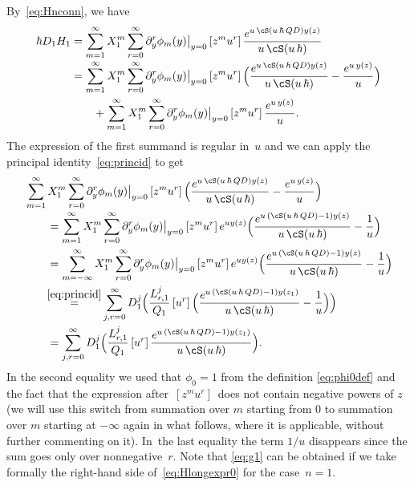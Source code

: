 By~\eqref{eq:Hnconn}, we have\vspace*{-3pt}
\begin{equation}
\begin{aligned}\label{eq:DHg1step1}
\hbar D_1H_{1}
&=\sum_{m=1}^\infty X_1^m\sum_{r=0}^\infty
\partial_y^r\phi_m(y)\big|_{y=0}\,[z^{m}u^r]\,
\frac{e^{u\,\cS(u\,\hbar\,Q D)y(z)}}{u\,\cS(u\,\hbar)}\\[-2pt]
&=\sum_{m=1}^\infty X_1^m\sum_{r=0}^\infty
\partial_y^r\phi_m(y)\big|_{y=0}\,[z^{m}u^r]\,\Bigl(
\frac{e^{u\,\cS(u\,\hbar\,Q D)y(z)}}{u\,\cS(u\,\hbar)}-
\frac{e^{u\,y(z)}}{u}\Bigr)
\\
&\qquad
+\sum_{m=1}^\infty X_1^m\sum_{r=0}^\infty
\partial_y^r\phi_m(y)\big|_{y=0}\,[z^{m}u^r]\,
\frac{e^{u\,y(z)}}{u}.
\end{aligned}
\end{equation}
The expression of the first summand is regular in~$u$ and we can apply the principal identity~\eqref{eq:princid} to get\vspace*{-3pt}
\begin{equation}\label{eq:g1}
\begin{aligned}
&\sum_{m=1}^\infty X_1^m\sum_{r=0}^\infty
\partial_y^r\phi_m(y)\big|_{y=0}\,[z^{m}u^r]\,\Bigl(
\frac{e^{u\,\cS(u\,\hbar\,Q D)y(z)}}{u\,\cS(u\,\hbar)}-
\frac{e^{u\,y(z)}}{u}\Bigr)\\[-2pt]
&\qquad=\sum_{m=1}^\infty X_1^m\sum_{r=0}^\infty
\partial_y^r\phi_m(y)\big|_{y=0}\,[z^{m}u^r]\,e^{uy(z)}\Bigl(
\frac{e^{u\,(\cS(u\,\hbar\,Q D)-1)y(z)}}{u\,\cS(u\,\hbar)}-
\frac{1}{u}\Bigr)\\
&\qquad=\sum_{m=-\infty}^\infty X_1^m\sum_{r=0}^\infty
\partial_y^r\phi_m(y)\big|_{y=0}\,[z^{m}u^r]\,e^{uy(z)}\Bigl(
\frac{e^{u\,(\cS(u\,\hbar\,Q D)-1)y(z)}}{u\,\cS(u\,\hbar)}-
\frac{1}{u}\Bigr)\\
&\qquad\!\mathop{=}^{\eqref{eq:princid}}
\sum_{j,r=0}^\infty D_1^j \Bigl(\frac{L_{r,1}^j}{Q_1}
\,[u^r]\, \Bigl(\frac{e^{u\,(\cS(u\,\hbar\,Q D)-1)y(z_1)}}{u\,\cS(u\,\hbar)}-\dfrac{1}{u} \Bigr) \Bigr)\\
&\qquad=
\sum_{j,r=0}^\infty D_1^j \Bigl(\frac{L_{r,1}^j}{Q_1}
\,[u^r]\, \frac{e^{u\,(\cS(u\,\hbar\,Q D)-1)y(z_1)}}{u\,\cS(u\,\hbar)} \Bigr).
\end{aligned}
\end{equation}
In the second equality we used that $\phi_0=1$ from the definition \eqref{eq:phi0def} and the fact that the expression after $\,[z^mu^r]\,$ does not contain negative powers of $z$ (we will use this switch from summation over $m$ starting from $0$ to summation over $m$ starting at $-\infty$ again in what follows, where it is applicable, without further commenting on it).
In~the last equality the term $1/u$ disappears since the sum goes only over nonnegative~$r$.
Note that \eqref{eq:g1} can be obtained if we take formally the right-hand side of~\eqref{eq:Hlongexpr0} for the case~$n=1$.

